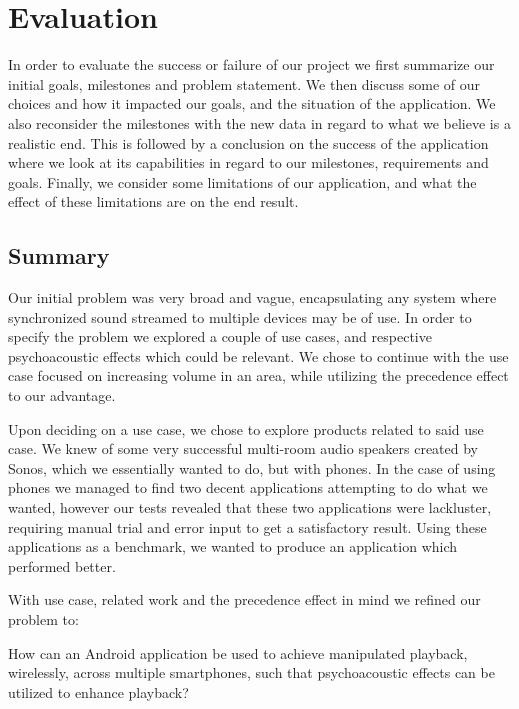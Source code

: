 \chapter{Evaluation}\label{cha:conclusion}
In order to evaluate the success or failure of our project we first summarize our initial goals, milestones and problem statement.
We then discuss some of our choices and how it impacted our goals, and the situation of the application.
We also reconsider the milestones with the new data in regard to what we believe is a realistic end.
This is followed by a conclusion on the success of the application where we look at its capabilities in regard to our milestones, requirements and goals.
Finally, we consider some limitations of our application, and what the effect of these limitations are on the end result.

\section{Summary}
Our initial problem was very broad and vague, encapsulating any system where synchronized sound streamed to multiple devices may be of use.
In order to specify the problem we explored a couple of use cases, and respective psychoacoustic effects which could be relevant.
We chose to continue with the use case focused on increasing volume in an area, while utilizing the precedence effect to our advantage.

Upon deciding on a use case, we chose to explore products related to said use case.
We knew of some very successful multi-room audio speakers created by Sonos, which we essentially wanted to do, but with phones.
In the case of using phones we managed to find two decent applications attempting to do what we wanted, however our tests revealed that these two applications were lackluster, requiring manual trial and error input to get a satisfactory result.
Using these applications as a benchmark, we wanted to produce an application which performed better.

With use case, related work and the precedence effect in mind we refined our problem to:
\begin{problemstatement}
    How can an Android application be used to achieve manipulated playback, wirelessly, across multiple smartphones, such that psychoacoustic effects can be utilized to enhance playback?
\end{problemstatement}

